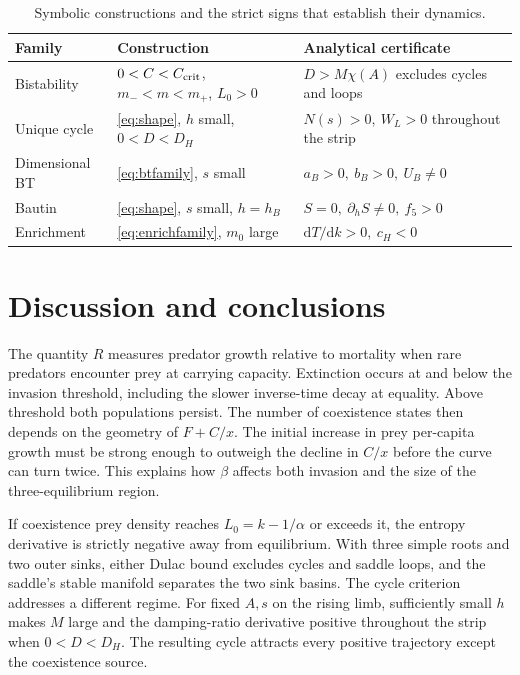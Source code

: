 \documentclass[12pt,a4paper,twoside,fleqn]{article}
\theoremstyle{journal}
\newcommand{\dd}{\mathrm{d}}
\begin{document}
\begin{table}[H]\centering
\caption{Symbolic constructions and the strict signs that establish their dynamics.}
\begin{tabularx}{\linewidth}{@{}lYY@{}}\toprule
Family & Construction & Analytical certificate\\ \midrule
Bistability & \(0<C<C_{\rm crit}\), \(m_-<m<m_+\), \(L_0>0\) & \(D>M\chi(A)\) excludes cycles and loops\\
Unique cycle & \eqref{eq:shape}, \(h\) small, \(0<D<D_H\) & \(N(s)>0,\ W_L>0\) throughout the strip\\
Dimensional BT & \eqref{eq:btfamily}, \(s\) small & \(a_B>0,\ b_B>0,\ U_B\ne0\)\\
Bautin & \eqref{eq:shape}, \(s\) small, \(h=h_B\) & \(S=0,\ \partial_h S\ne0,\ f_5>0\)\\
Enrichment & \eqref{eq:enrichfamily}, \(m_0\) large & \(\dd T/\dd k>0,\ c_H<0\)\\
\bottomrule\end{tabularx}
\end{table}

\section{Discussion and conclusions}
The quantity \(R\) measures predator growth relative to mortality when rare predators encounter prey at carrying capacity. Extinction occurs at and below the invasion threshold, including the slower inverse-time decay at equality. Above threshold both populations persist. The number of coexistence states then depends on the geometry of \(F+C/x\). The initial increase in prey per-capita growth must be strong enough to outweigh the decline in \(C/x\) before the curve can turn twice. This explains how \(\beta\) affects both invasion and the size of the three-equilibrium region.

If coexistence prey density reaches \(L_0=k-1/\alpha\) or exceeds it, the entropy derivative is strictly negative away from equilibrium. With three simple roots and two outer sinks, either Dulac bound excludes cycles and saddle loops, and the saddle's stable manifold separates the two sink basins. The cycle criterion addresses a different regime. For fixed \(A,s\) on the rising limb, sufficiently small \(h\) makes \(M\) large and the damping-ratio derivative positive throughout the strip when \(0<D<D_H\). The resulting cycle attracts every positive trajectory except the coexistence source.
\end{document}
